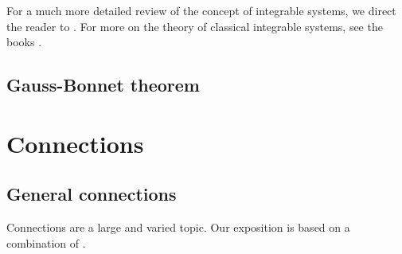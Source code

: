 For a much more detailed review of the concept of integrable systems, we direct the reader to \cite{deift}. For more on the theory of classical integrable systems, see the books \cite{moser,babelon}.



\subsection{Gauss-Bonnet theorem}














\clearpage
\section{Connections}

\subsection{General connections}\label{sec general connections}

Connections are a large and varied topic. Our exposition is based on a combination of \cite{Vakar,RS2,Kolar}.


